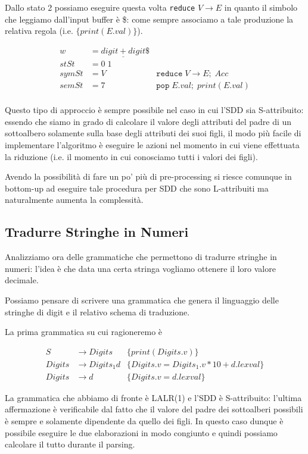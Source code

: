 \documentclass[class=book, crop=false, oneside, 12pt]{standalone}
\begin{document}
Dallo stato 2 possiamo eseguire questa volta \texttt{reduce} \(V \to E\) in quanto il simbolo che leggiamo dall'input buffer è \$: come sempre associamo a tale produzione la relativa regola (i.e. \(\{print(E.val)\}\)).

\begin{align*}
    w &= \underline{digit + digit}\$ \\
    stSt &= 0\; 1 \\
    symSt &= V &\texttt{reduce}\; V \to E;\; Acc \\     
    semSt &= 7 &\texttt{pop}\;E.val;\; print(E.val)\\
\end{align*}

Questo tipo di approccio è sempre possibile nel caso in cui l'SDD sia S-attribuito: essendo che siamo in grado di calcolare il valore degli attributi del padre di un sottoalbero solamente sulla base degli attributi dei suoi figli, il modo più facile di implementare l'algoritmo è eseguire le azioni nel momento in cui viene effettuata la riduzione (i.e. il momento in cui conosciamo tutti i valori dei figli). 

Avendo la possibilità di fare un po' più di pre-processing si riesce comunque in bottom-up ad eseguire tale procedura per SDD che sono L-attribuiti ma naturalmente aumenta la complessità. 

\subsection{Tradurre Stringhe in Numeri}

Analizziamo ora delle grammatiche che permettono di tradurre stringhe in numeri: l'idea è che data una certa stringa vogliamo ottenere il loro valore decimale. 

Possiamo pensare di scrivere una grammatica che genera il linguaggio delle stringhe di digit e il relativo schema di traduzione. 

La prima grammatica su cui ragioneremo è

\begin{align*}
    S &\to Digits	&\{print(Digits.v)\} \\
    Digits &\to Digits_1 d	&\{Digits.v = Digits_1.v * 10 + d.lexval\} \\
    Digits &\to d	&\{Digits.v = d.lexval\}
\end{align*}

La grammatica che abbiamo di fronte è LALR(1) e l'SDD è S-attribuito: l'ultima affermazione è verificabile dal fatto che il valore del padre dei sottoalberi possibili è sempre e solamente dipendente da quello dei figli. In questo caso dunque è possibile eseguire le due elaborazioni in modo congiunto e quindi possiamo calcolare il tutto durante il parsing. 
\end{document}
